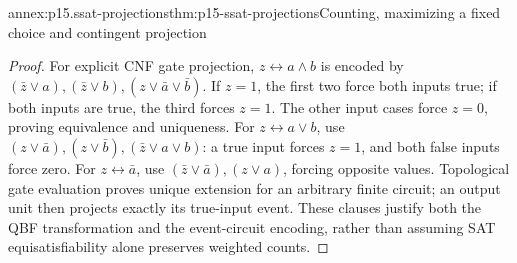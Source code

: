 \begin{annexitem}{annex:p15.ssat-projections}{thm:p15-ssat-projections}{Counting, maximizing a fixed choice and contingent projection}
\begin{proof}
For explicit CNF gate projection, \(z\leftrightarrow a\land b\)
is encoded by \((\bar z\lor a),(\bar z\lor b),
(z\lor\bar a\lor\bar b)\). If \(z=1\), the first two force
both inputs true; if both inputs are true, the third forces \(z=1\).
The other input cases force \(z=0\), proving equivalence and uniqueness.
For \(z\leftrightarrow a\lor b\), use
\((z\lor\bar a),(z\lor\bar b),(\bar z\lor a\lor b)\):
a true input forces \(z=1\), and both false inputs force zero.
For \(z\leftrightarrow\bar a\), use
\((\bar z\lor\bar a),(z\lor a)\), forcing opposite values.
Topological gate evaluation proves unique extension for an arbitrary
finite circuit; an output unit then projects exactly its true-input
event. These clauses justify both the QBF transformation and the
event-circuit encoding, rather than assuming SAT equisatisfiability
alone preserves weighted counts.
\end{proof}
\end{annexitem}

